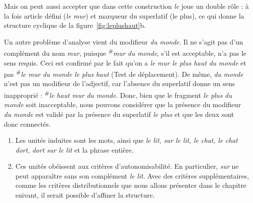 {\begin{enumerate}[label=\alph*.]
Mais on peut aussi accepter que dans cette construction \textit{le} joue un double rôle : à la fois article défini (\textit{le mur}) et marqueur du superlatif (le plus), ce qui donne la structure cyclique de la figure~\ref{fig:leplushaut}b.



Un autre problème d’analyse vient du modifieur \textit{du monde}. Il ne s’agit pas d’un complément du nom \textit{mur}, puisque \textsuperscript{\#}\textit{mur du monde}, s’il est acceptable, n’a pas le sens requis. Ceci est confirmé par le fait qu'on a \textit{le mur le plus haut du monde} et pas \textsuperscript{\#}\textit{le mur du monde le plus haut} (Test de déplacement). De même, \textit{du monde} n’est pas un modifieur de l’adjectif, car l’absence du superlatif donne un sens inapproprié : \textsuperscript{\#}\textit{le haut mur du monde}. Donc, bien que le fragment \textit{le plus du monde} soit inacceptable, nous pouvons considérer que la présence du modifieur \textit{du monde} est validé par la présence du superlatif \textit{le plus} et que les deux sont donc connectés.
\end{enumerate}

\begin{enumerate}[label=\alph*.]
\item Les unités induites sont les mots, ainsi que \textit{le lit, sur le lit, le chat, le chat dort, dort sur le lit} et la phrase entière.
\item Ces unités obéissent aux critères d’autonomisabilité. En particulier, \textit{sur} ne peut apparaître sans son complément \textit{le lit}. Avec des critères supplémentaires, comme les critères distributionnels que nous allons présenter dans le chapitre suivant, il serait possible d'affiner la structure.
\end{enumerate}}
